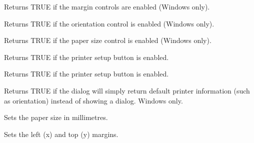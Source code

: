 
Returns TRUE if the margin controls are enabled (Windows only).

\label{wxpagesetupdatagetenableorientation}


Returns TRUE if the orientation control is enabled (Windows only).

\label{wxpagesetupdatagetenablepaper}


Returns TRUE if the paper size control is enabled (Windows only).

\label{wxpagesetupdatagetenableprinter}


Returns TRUE if the printer setup button is enabled.

\label{wxpagesetupdatagetenablehelp}


Returns TRUE if the printer setup button is enabled.

\label{wxpagesetupdatagetdefaultinfo}


Returns TRUE if the dialog will simply return default printer information (such as orientation)
instead of showing a dialog. Windows only.

\label{wxpagesetupdatasetpapersize}


Sets the paper size in millimetres.

\label{wxpagesetupdatasetmargintopleft}


Sets the left (x) and top (y) margins.

\label{wxpagesetupdatasetmarginbottomright}


